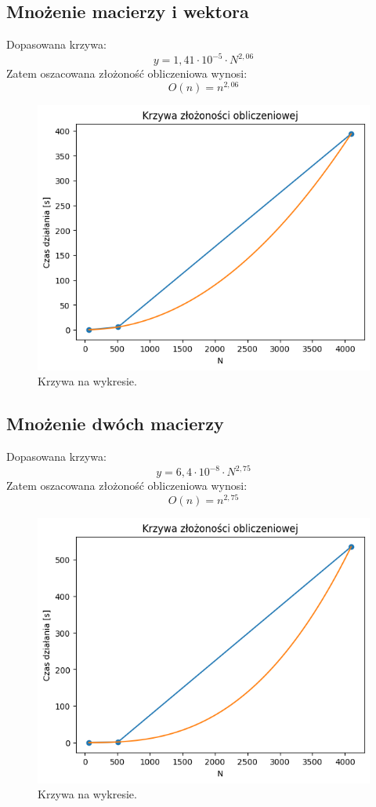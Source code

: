 \documentclass[11pt, leqno]{scrartcl}
\begin{document}
    \subsection{Mnożenie macierzy i wektora}
    Dopasowana krzywa:
    \[
        y=1,41 \cdot 10^{-5} \cdot N^{2,06}
    \]
    Zatem oszacowana złożoność obliczeniowa wynosi:
    \[
        O(n)=n^{2,06}
    \]
    \begin{figure}[H]
        \centering
        \includegraphics[width=0.7\linewidth]{matrix_vector_comp.png}
        \caption{Krzywa na wykresie.}
    \end{figure}

    \subsection{Mnożenie dwóch macierzy}
    Dopasowana krzywa:
    \[
        y=6,4 \cdot 10^{-8} \cdot N^{2,75}
    \]
    Zatem oszacowana złożoność obliczeniowa wynosi:
    \[
        O(n)=n^{2,75}
    \]
    \begin{figure}[H]
        \centering
        \includegraphics[width=0.7\linewidth]{matrix_matrix_comp.png}
        \caption{Krzywa na wykresie.}
    \end{figure}

    \section{}
\end{document}
